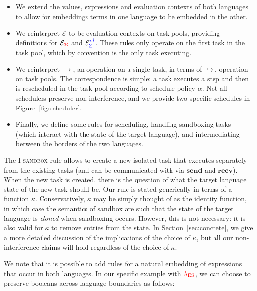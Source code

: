 \documentclass{sigplanconf}
\newcommand{\Varid}[1]{\mathit{#1}}
\newcommand{\Red}[1]{{\color{red} #1}}
\begin{document}
\begin{itemize}
    \item We extend the values, expressions and evaluation contexts of both languages to allow for embeddings terms in one language to be embedded in the other.
    \item We reinterpret \ensuremath{\mathcal{E}} to be evaluation contexts on task pools, providing definitions for \ensuremath{\mathcal{E}_{\tar{\Sigma}}} and \ensuremath{\mathcal{E}_{\ifc{\Sigma}}^{\ifc{\Varid{i}},\ifc{l}}}.  These rules only operate on the first task in the task pool, which by convention is the only task executing.
    \item We reinterpret \ensuremath{\rightarrow}, an operation on a single task, in terms of \ensuremath{\hookrightarrow}, operation on task pools.  The correspondence is simple: a task executes a step and then is rescheduled in the task pool according to schedule policy \ensuremath{\alpha}.  Not all schedulers preserve non-interference, and we provide two specific schedules in Figure~\ref{fig:scheduler}.
    \item Finally, we define some rules for scheduling, handling sandboxing tasks (which interact with the state of the target language),
    and intermediating between the borders of the two languages.
\end{itemize}

The \textsc{I-sandbox} rule allows to create a new isolated task that
executes separately from the existing tasks (and can be communicated
with via \ensuremath{\mathbf{send}} and \ensuremath{\mathbf{recv}}).  When the new task is created, there
is the question of what the target language state of the new task should
be.  Our rule is stated generically in terms of a function \ensuremath{\kappa}.
Conservatively, \ensuremath{\kappa} may be simply thought of as the identity
function, in which
case the semantics of sandbox are such that the state of the target language is \emph{cloned}
when sandboxing occurs.  However, this is not necessary: it is also valid for \ensuremath{\kappa}
to remove entries from the state.  In Section~\ref{sec:concrete}, we give a more detailed
discussion of the implications of the choice of \ensuremath{\kappa}, but all our
non-interference claims will hold regardless of the choice of \ensuremath{\kappa}.

We note that it is possible to add rules for a natural embedding of
expressions that occur in both languages.  In our specific example
with \ensuremath{\Red{\lambda_{\text{ES}}}}, we can choose to preserve booleans across
language boundaries as follows:
\end{document}
